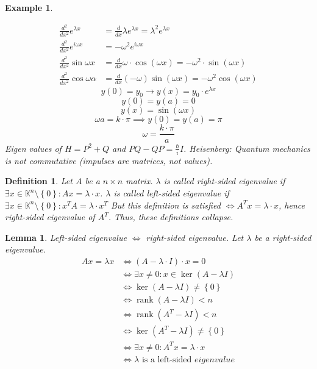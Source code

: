 \documentclass{article}
\newtheorem{example}{Example}  \numberwithin{example}{section}
\newtheorem{definition}{Definition}  \numberwithin{definition}{section}
\newtheorem{lemma}{Lemma}  \numberwithin{lemma}{section}
\newcommand{\set}[1]{\left\{#1\right\}}
\DeclareMathOperator{\rank}{rank}
\begin{document}
\begin{example}
\begin{enumerate}
\begin{align*}
        \frac{d^2}{dx^2} e^{\lambda x} &= \frac{d}{dx} \lambda e^{\lambda x} = \lambda^2 e^{\lambda x} \\
        \frac{d^2}{dx^2} e^{i \omega x} &= -\omega^2 e^{i\omega x} \\
        \frac{d^2}{dx^2} \sin{\omega x} &= \frac{d}{dx} \omega \cdot \cos(\omega x) = -\omega^2 \cdot \sin(\omega x) \\
        \frac{d^2}{dx^2} \cos{\omega \alpha} &= \frac{d}{dx} (-\omega) \sin(\omega x) = -\omega^2 \cos(\omega x)
      \end{align*}
      \[ y(0) = y_0 \to y(x) = y_0 \cdot e^{\lambda x} \]
      \[ y(0) = y(a) = 0 \]
      \[ y(x) = \sin(\omega x) \]
      \[ \omega a = k \cdot \pi \implies y(0) = y(a) = \pi \]
      \[ \omega = \frac{k \cdot \pi}{a} \]
      Eigen values of $H = P^2 + Q$ and $PQ - QP = \frac{\hbar}{i} I$. Heisenberg: Quantum mechanics is not commutative (impulses are matrices, not values).
  \end{enumerate}
\end{example}

\begin{definition} %
  Let $A$ be a $n \times n$ matrix.
  $\lambda$ is called right-sided eigenvalue if $\exists x \in \mathbb K^n \setminus \set{0}: Ax = \lambda \cdot x$.
  $\lambda$ is called left-sided eigenvalue if $\exists x \in \mathbb K^n \setminus \set{0}: x^T A = \lambda \cdot x^T$
  But this definition is satisfied $\iff A^T x = \lambda \cdot x$, hence right-sided eigenvalue of $A^T$.
  Thus, these definitions collapse.
\end{definition}

\begin{lemma} %
  Left-sided eigenvalue $\iff$ right-sided eigenvalue.
  Let $\lambda$ be a right-sided eigenvalue.
  \begin{align*}
    Ax = \lambda x &\iff (A - \lambda \cdot I) \cdot x = 0 \\
      &\iff \exists x \neq 0: x \in \ker(A - \lambda I) \\
      &\iff \ker(A - \lambda I) \neq \set{0} \\
      &\iff \rank(A - \lambda I) < n \\
      &\iff \rank(A^T - \lambda I) < n \\
      &\iff \ker(A^T - \lambda I) \neq \set{0} \\
      &\iff \exists x \neq 0: A^T x = \lambda \cdot x \\
      &\iff \lambda \text{ is a left-sided } eigenvalue
  \end{align*}
\end{lemma}
\end{document}
